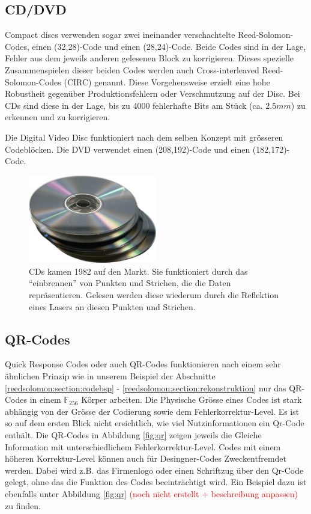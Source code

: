 \subsection{CD/DVD}
Compact discs verwenden sogar zwei ineinander verschachtelte Reed-Solomon-Codes, einen (32,28)-Code und einen (28,24)-Code.
Beide Codes sind in der Lage, Fehler aus dem jeweils anderen gelesenen Block zu korrigieren. Dieses spezielle Zusammenspielen dieser beiden Codes werden auch Cross-interleaved Reed-Solomon-Codes (CIRC) genannt.
Diese Vorgehensweise erzielt eine hohe Robustheit gegenüber Produktionsfehlern oder Verschmutzung auf der Disc. Bei CDs sind diese in der Lage, bis zu 4000 fehlerhafte Bits am Stück (ca. $2.5mm$) zu erkennen und zu korrigieren. 

Die Digital Video Disc funktioniert nach dem selben Konzept mit grösseren Codeblöcken. Die DVD verwendet einen (208,192)-Code und einen (182,172)-Code.


\begin{figure}
	\centering
	\includegraphics[width=0.5\textwidth]{papers/reedsolomon/images/Compact_Disc}
	\caption{CDs kamen 1982 auf den Markt. Sie funktioniert durch das ``einbrennen'' von Punkten und Strichen, die die Daten repräsentieren. Gelesen werden diese wiederum durch die Reflektion eines Lasers an diesen Punkten und Strichen.}
	\label{fig:cd}
\end{figure}

\subsection{QR-Codes}
Quick Response Codes oder auch QR-Codes funktionieren nach einem sehr ähnlichen Prinzip wie in unserem Beispiel der Abschnitte \ref{reedsolomon:section:codebsp} - \ref{reedsolomon:section:rekonstruktion} nur das QR-Codes in einem $\mathbb{F}_{256}$ Körper arbeiten. Die Physische Grösse eines Codes ist stark abhängig von der Grösse der Codierung sowie dem Fehlerkorrektur-Level. Es ist so auf dem ersten Blick nicht ersichtlich, wie viel Nutzinformationen ein Qr-Code enthält. Die QR-Codes in Abbildung \ref{fig:qr} zeigen jeweils die Gleiche Information mit unterschiedlichem Fehlerkorrektur-Level. Codes mit einem höheren Korrektur-Level können auch für Desingner-Codes Zweckentfremdet werden. Dabei wird z.B. das Firmenlogo oder einen Schriftzug über den Qr-Code gelegt, ohne das die Funktion des Codes beeinträchtigt wird. Ein Beispiel dazu ist ebenfalls unter Abbildung \ref{fig:qr} \textcolor{red}{(noch nicht erstellt + beschreibung anpassen)} zu finden. 

